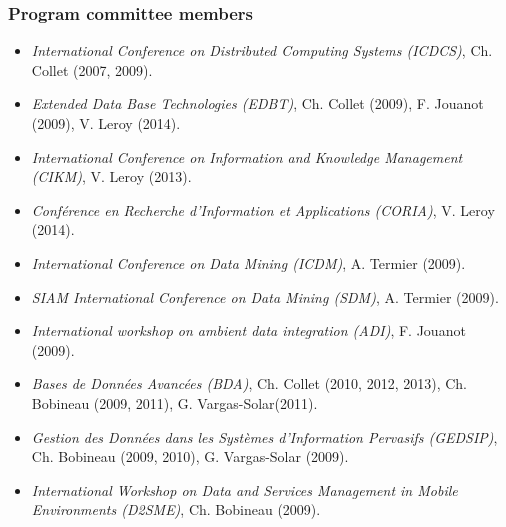 \subsubsection*{Program committee members}

\begin{itemize}
\setlength{\itemindent}{-0.5cm}
\setlength{\itemsep}{-0.1cm}

\item {\it International Conference on Distributed Computing Systems (ICDCS)}, Ch. Collet (2007, 2009).

\item {\it Extended Data Base Technologies (EDBT)}, Ch. Collet (2009), F. Jouanot (2009), V. Leroy (2014).

\item {\it International Conference on Information and Knowledge Management (CIKM)}, V. Leroy (2013).

\item {\it Conférence en Recherche d'Information et Applications (CORIA)}, V. Leroy (2014).

\item {\it International Conference on Data Mining (ICDM)}, A. Termier (2009).

\item {\it SIAM International Conference on Data Mining (SDM)}, A. Termier (2009).

\item {\it International workshop on ambient data integration (ADI)}, F. Jouanot (2009).

\item {\it Bases de Donn{\'e}es Avanc{\'e}es (BDA)}, Ch. Collet (2010, 2012, 2013), Ch. Bobineau (2009, 2011), G. Vargas-Solar(2011).

\item {\it Gestion des Donn{\'e}es dans les Syst{\`e}mes d'Information Pervasifs (GEDSIP)}, Ch. Bobineau (2009, 2010), G. Vargas-Solar (2009).

\item {\it International Workshop on Data and Services Management in Mobile Environments (D2SME)}, Ch. Bobineau (2009).


\end{itemize}
